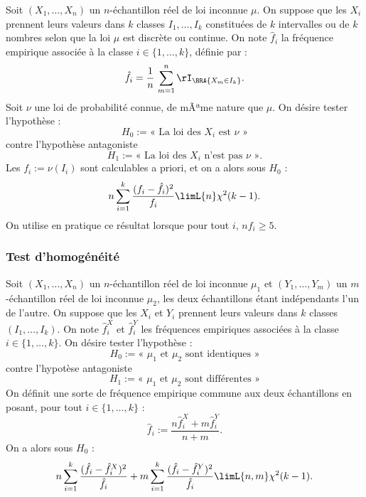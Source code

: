 Soit $(X_1,\ldots,X_n)$ un $n$-échantillon réel de loi inconnue $\mu$. On
suppose que les $X_i$ prennent leurs valeurs dans $k$ classes $I_1,\ldots,I_k$
constituées de $k$ intervalles ou de $k$ nombres selon que la loi $\mu$ est
discrète ou continue. On note $\hat f_i$ la fréquence empirique associée à la
classe $i\in\{1,\ldots,k\}$, définie par :
\begin{equation*}
  \hat f_i=\frac{1}{n}\,\sum_{m=1}^n \rI_\BRA{X_m \in I_k}.
\end{equation*}
Soit $\nu$ une loi de probabilité connue, de mÃªme nature que $\mu$. On désire
tester l'hypothèse :
$$
H_0:=\text{« La loi des } X_i \text{ est } \nu \text{ »} 
$$
contre l'hypothèse antagoniste 
$$
H_1:=\text{« La loi des } X_i \text{ n'est pas } \nu \text{ »}.
$$
Les $f_i:=\nu(I_i)$ sont calculables a priori, et on a alors sous $H_0$ :
\begin{equation*}
  n\sum_{i=1}^k \frac{(f_i-\hat f_i)^2}{f_i} \limL{n} \chi^2(k-1).
\end{equation*}
On utilise en pratique ce résultat lorsque pour tout $i$, $n f_i \geq 5$.

\subsubsection{Test d'homogénéité} 

Soit $(X_1,\ldots,X_n)$ un $n$-échantillon réel de loi inconnue $\mu_1$ et
$(Y_1,\ldots,Y_m)$ un $m$-échantillon réel de loi inconnue $\mu_2$, les deux
échantillons étant indépendants l'un de l'autre. On suppose que les $X_i$ et
$Y_i$ prennent leurs valeurs dans $k$ classes $(I_1,\ldots,I_k)$. On note
$\hat f^X_i$ et $\hat f^Y_i$ les fréquences empiriques associées à la classe
$i\in\{1,\ldots,k\}$. On désire tester l'hypothèse :
$$
H_0:=\text{« } \mu_1 \text{ et } \mu_2 \text{ sont identiques »}
$$
contre l'hypotèse antagoniste
$$
H_1:=\text{« } \mu_1 \text{ et } \mu_2 \text{ sont différentes »}
$$
On définit une sorte de fréquence empirique commune aux deux échantillons
en posant, pour tout $i\in\{1,\ldots,k\}$ :
\begin{equation*}
  \hat f_i := \frac{n\hat f^X_i + m\hat f^Y_i}{n+m}.
\end{equation*}
On a alors sous $H_0$ :
\begin{equation*}
  n\sum_{i=1}^k \frac{(\hat f_i-\hat f^X_i)^2}{\hat f_i}
 +m\sum_{i=1}^k \frac{(\hat f_i-\hat f^Y_i)^2}{\hat f_i} 
 \limL{n,m} \chi^2(k-1).
\end{equation*}

